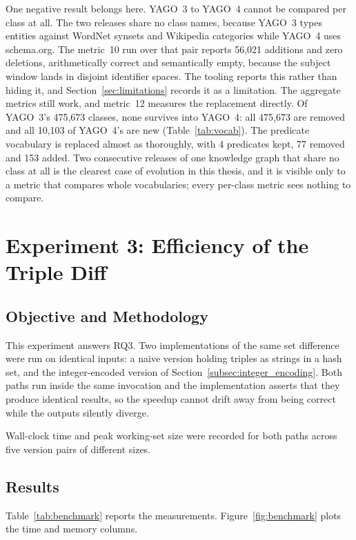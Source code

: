 One negative result belongs here. YAGO~3 to YAGO~4 cannot be compared per class
at all. The two releases share no class names, because YAGO~3 types entities
against WordNet synsets and Wikipedia categories while YAGO~4 uses schema.org.
The metric~10 run over that pair reports 56{,}021 additions and zero deletions,
arithmetically correct and semantically empty, because the subject window lands
in disjoint identifier spaces. The tooling reports this rather than hiding it,
and Section~\ref{sec:limitations} records it as a limitation. The aggregate
metrics still work, and metric~12 measures the replacement directly. Of YAGO~3's
475{,}673 classes, none survives into YAGO~4: all 475{,}673 are removed and all
10{,}103 of YAGO~4's are new (Table~\ref{tab:vocab}). The predicate vocabulary
is replaced almost as thoroughly, with 4 predicates kept, 77 removed and 153
added. Two consecutive releases of one knowledge graph that share no class at all
is the clearest case of evolution in this thesis, and it is visible only to a
metric that compares whole vocabularies; every per-class metric sees nothing to
compare.

\section{Experiment 3: Efficiency of the Triple Diff}
\label{sec:exp3}

\subsection{Objective and Methodology}

This experiment answers RQ3. Two implementations of the same set difference were
run on identical inputs: a naive version holding triples as strings in a hash
set, and the integer-encoded version of
Section~\ref{subsec:integer_encoding}. Both paths run inside the same invocation and
the implementation asserts that they produce identical results, so the speedup
cannot drift away from being correct while the outputs silently diverge.

Wall-clock time and peak working-set size were recorded for both paths across
five version pairs of different sizes.

\subsection{Results}

Table~\ref{tab:benchmark} reports the measurements.
Figure~\ref{fig:benchmark} plots the time and memory columns.

